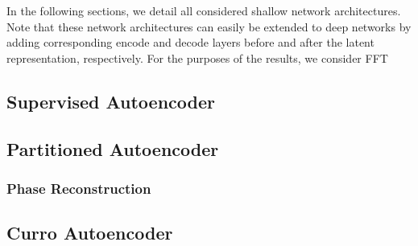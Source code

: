 In the following sections, we detail all considered shallow network architectures. Note that these network architectures can easily be extended to deep networks by adding corresponding encode and decode layers before and after the latent representation, respectively. For the purposes of the results, we consider FFT 

\subsection{Supervised Autoencoder}


\subsection{Partitioned Autoencoder}

\subsubsection{Phase Reconstruction}

\subsection{Curro Autoencoder}


